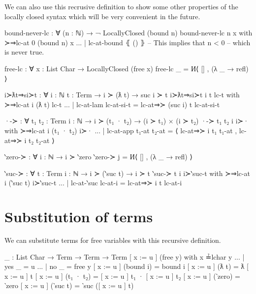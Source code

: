 We can also use this recrusive definition to show some other properties of the locally closed syntax
which will be very convenient in the future.
\begin{code}
  bound-never-lc : ∀ (n : ℕ) → ¬ LocallyClosed (bound n)
  bound-never-lc n x with ≻⇒lc-at 0 (bound n) x
  ... | lc-at-bound ⦃ () ⦄ -- This implies that n < 0
                          -- which is never true.

  free-lc : ∀ {x : List Char} → LocallyClosed (free x)
  free-lc _ = И⟨ [] , (λ _ → refl) ⟩

  i≻ƛt⇒si≻t : ∀ {i : ℕ} {t : Term} → i ≻ (ƛ t) → suc i ≻ t
  i≻ƛt⇒si≻t {i} {t} lc-t with ≻⇒lc-at i (ƛ t) lc-t
  ... | lc-at-lam lc-at-si-t = lc-at⇒≻ (suc i) t lc-at-si-t

  ·-≻ : ∀ {t₁ t₂ : Term} {i : ℕ}
    → i ≻ (t₁ · t₂) → (i ≻ t₁) × (i ≻ t₂)
  ·-≻ {t₁} {t₂} {i} i≻· with ≻⇒lc-at i (t₁ · t₂) i≻·
  ... | lc-at-app t₁-at t₂-at =
    ⟨ lc-at⇒≻ i t₁ t₁-at
    , lc-at⇒≻ i t₂ t₂-at ⟩

  ‵zero-≻ : ∀ {i : ℕ} → i ≻ ‵zero
  ‵zero-≻ j = И⟨ [] , (λ _ → refl) ⟩

  ‵suc-≻ : ∀ {t : Term} {i : ℕ} → i ≻ (‵suc t) → i ≻ t
  ‵suc-≻ {t} {i} i≻‵suc-t with ≻⇒lc-at i (‵suc t) i≻‵suc-t
  ... | lc-at-‵suc lc-at-i = lc-at⇒≻ i t lc-at-i
\end{code}

\section{Substitution of terms}
\label{appendix:substitution_proofs}
We can substitute terms for free variables with this recursive definition.
\begin{code}
  [_:=_]_ : List Char → Term → Term → Term
  [ x := u ] (free y) with x ≟lchar y
  ... | yes _ = u
  ... | no  _ = free y
  [ x := u ] (bound i) = bound i
  [ x := u ] (ƛ t) = ƛ [ x := u ] t
  [ x := u ] (t₁ · t₂) = [ x := u ] t₁ · [ x := u ] t₂
  [ x := u ] (‵zero) = ‵zero
  [ x := u ] (‵suc t) = ‵suc ([ x := u ] t)
\end{code}

